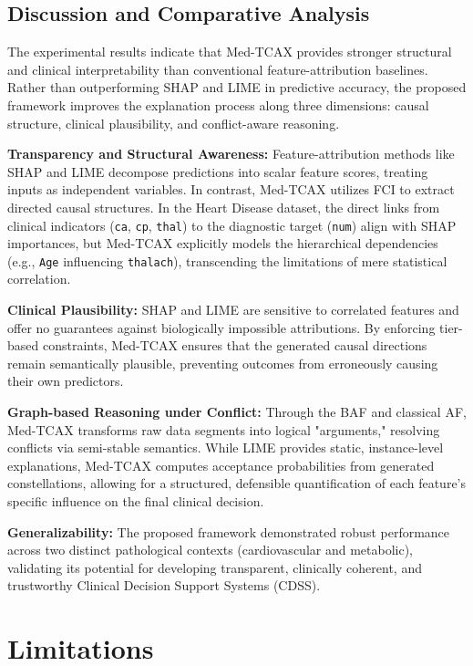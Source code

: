 \documentclass[conference, a4paper]{IEEEtran}
\begin{document}
\subsection{Discussion and Comparative Analysis}

The experimental results indicate that Med-TCAX provides stronger structural and clinical interpretability than conventional feature-attribution baselines. Rather than outperforming SHAP and LIME in predictive accuracy, the proposed framework improves the explanation process along three dimensions: causal structure, clinical plausibility, and conflict-aware reasoning.

\textbf{Transparency and Structural Awareness:} Feature-attribution methods like SHAP and LIME decompose predictions into scalar feature scores, treating inputs as independent variables. In contrast, Med-TCAX utilizes FCI to extract directed causal structures. In the Heart Disease dataset, the direct links from clinical indicators (\texttt{ca}, \texttt{cp}, \texttt{thal}) to the diagnostic target (\texttt{num}) align with SHAP importances, but Med-TCAX explicitly models the hierarchical dependencies (e.g., \texttt{Age} influencing \texttt{thalach}), transcending the limitations of mere statistical correlation.

\textbf{Clinical Plausibility:} SHAP and LIME are sensitive to correlated features and offer no guarantees against biologically impossible attributions. By enforcing tier-based constraints, Med-TCAX ensures that the generated causal directions remain semantically plausible, preventing outcomes from erroneously causing their own predictors.

\textbf{Graph-based Reasoning under Conflict:} Through the BAF and classical AF, Med-TCAX transforms raw data segments into logical "arguments," resolving conflicts via semi-stable semantics. While LIME provides static, instance-level explanations, Med-TCAX computes acceptance probabilities from generated constellations, allowing for a structured, defensible quantification of each feature's specific influence on the final clinical decision. 

\textbf{Generalizability:} The proposed framework demonstrated robust performance across two distinct pathological contexts (cardiovascular and metabolic), validating its potential for developing transparent, clinically coherent, and trustworthy Clinical Decision Support Systems (CDSS).

\section{Limitations}
\end{document}
